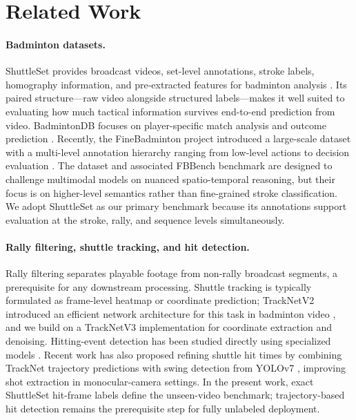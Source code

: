 \section{Related Work}

\paragraph{Badminton datasets.}  ShuttleSet provides broadcast videos, set-level
annotations, stroke labels, homography information, and pre-extracted features
for badminton analysis \cite{shuttleset}. Its paired structure—raw video
alongside structured labels—makes it well suited to evaluating how much tactical
information survives end-to-end prediction from video. BadmintonDB focuses on
player-specific match analysis and outcome prediction \cite{badmintondb}.
Recently, the FineBadminton project introduced a large-scale dataset with a
multi-level annotation hierarchy ranging from low-level actions to decision
evaluation \cite{finebadminton}. The dataset and associated FBBench benchmark
are designed to challenge multimodal models on nuanced spatio-temporal reasoning,
but their focus is on higher-level semantics rather than fine-grained stroke
classification. We adopt ShuttleSet as our primary benchmark because its
annotations support evaluation at the stroke, rally, and sequence levels
simultaneously.

\paragraph{Rally filtering, shuttle tracking, and hit detection.}
Rally filtering separates playable footage from non-rally broadcast segments, a
prerequisite for any downstream processing. Shuttle tracking is typically
formulated as frame-level heatmap or coordinate prediction; TrackNetV2
introduced an efficient network architecture for this task in badminton video
\cite{tracknetv2}, and we build on a TrackNetV3 implementation for coordinate
extraction and denoising. Hitting-event detection has been studied directly
using specialized models \cite{chen2023hitting}. Recent work has also proposed
refining shuttle hit times by combining TrackNet trajectory predictions with
swing detection from YOLOv7 \cite{hsu2024enhancing}, improving shot extraction
in monocular-camera settings. In the present work, exact ShuttleSet hit-frame
labels define the unseen-video benchmark; trajectory-based hit detection
remains the prerequisite step for fully unlabeled deployment.

